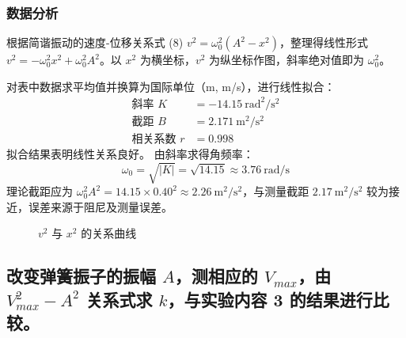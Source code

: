 \documentclass[11pt]{article}
\begin{document}
\subsubsection{数据分析}
根据简谐振动的速度-位移关系式 (8) $v^2 = \omega_0^2(A^2 - x^2)$，整理得线性形式 $v^2 = -\omega_0^2 x^2 + \omega_0^2 A^2$。以 $x^2$ 为横坐标，$v^2$ 为纵坐标作图，斜率绝对值即为 $\omega_0^2$。

对表中数据求平均值并换算为国际单位（m, m/s），进行线性拟合：
\begin{align*}
\text{斜率 } K &= -14.15\ \mathrm{rad^2/s^2} \\
\text{截距 } B &= 2.171\ \mathrm{m^2/s^2} \\
\text{相关系数 } r &= 0.998
\end{align*}
拟合结果表明线性关系良好。
由斜率求得角频率：
\begin{equation}
\omega_0 = \sqrt{|K|} = \sqrt{14.15} \approx 3.76\ \mathrm{rad/s}
\end{equation}
理论截距应为 $\omega_0^2 A^2 = 14.15 \times 0.40^2 \approx 2.26\ \mathrm{m^2/s^2}$，与测量截距 $2.17\ \mathrm{m^2/s^2}$ 较为接近，误差来源于阻尼及测量误差。

\begin{figure}[H]
    \centering
    \caption{$v^2$ 与 $x^2$ 的关系曲线}
    \label{fig:v2-x2}
\end{figure}

\subsection{改变弹簧振子的振幅 $A$，测相应的 $V_{max}$，由 $V_{max}^2 - A^2$ 关系式求 $k$，与实验内容 3 的结果进行比较。}
\end{document}
